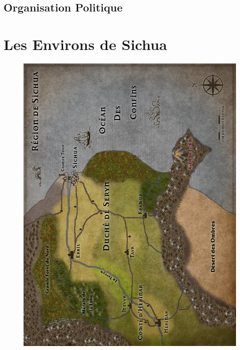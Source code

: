 \documentclass{dd}
\begin{document}
\section{Organisation Politique}




\chapter{Les Environs de Sichua}

\begin{figure}[p]
\includegraphics[width=17.5cm]{Maps/RegionL.jpg}
\end{figure}




\end{document}

